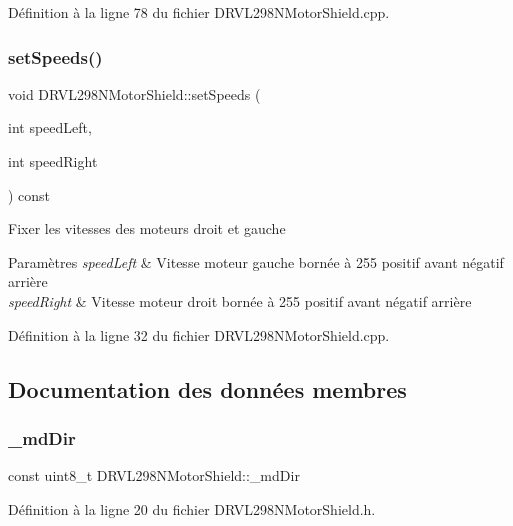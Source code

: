 Définition à la ligne 78 du fichier D\+R\+V\+L298\+N\+Motor\+Shield.\+cpp.

\mbox{\label{class_d_r_v_l298_n_motor_shield_a88ba8ac5ea909f4525b9382a01108e2f}} 
\subsubsection{set\+Speeds()}
{\footnotesize\ttfamily void D\+R\+V\+L298\+N\+Motor\+Shield\+::set\+Speeds (\begin{DoxyParamCaption}\item[{int}]{speed\+Left,  }\item[{int}]{speed\+Right }\end{DoxyParamCaption}) const}

Fixer les vitesses des moteurs droit et gauche 
\begin{DoxyParams}{Paramètres}
{\em speed\+Left} & Vitesse moteur gauche bornée à 255 positif avant négatif arrière \\
\hline
{\em speed\+Right} & Vitesse moteur droit bornée à 255 positif avant négatif arrière\\
\hline
\end{DoxyParams}


Définition à la ligne 32 du fichier D\+R\+V\+L298\+N\+Motor\+Shield.\+cpp.



\subsection{Documentation des données membres}
\mbox{\label{class_d_r_v_l298_n_motor_shield_a188c63748b859614da68fa55e299eae0}} 
\subsubsection{\+\_\+md\+Dir}
{\footnotesize\ttfamily const uint8\+\_\+t D\+R\+V\+L298\+N\+Motor\+Shield\+::\+\_\+md\+Dir\hspace{0.3cm}{\ttfamily [private]}}



Définition à la ligne 20 du fichier D\+R\+V\+L298\+N\+Motor\+Shield.\+h.

